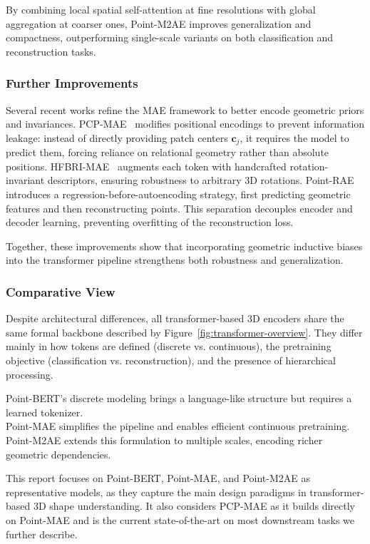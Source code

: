 By combining local spatial self-attention at fine resolutions with global aggregation at coarser ones, Point-M2AE improves generalization and compactness, outperforming single-scale variants on both classification and reconstruction tasks.

\subsubsection{Further Improvements}
\label{sssec:further_improvements}

Several recent works refine the MAE framework to better encode geometric priors and invariances.
PCP-MAE~\cite{pcpmae} modifies positional encodings to prevent information leakage: instead of directly providing patch centers $\mathbf{c}_j$, it requires the model to predict them, forcing reliance on relational geometry rather than absolute positions.
HFBRI-MAE~\cite{hfbrimae} augments each token with handcrafted rotation-invariant descriptors, ensuring robustness to arbitrary 3D rotations.
Point-RAE~\cite{prae} introduces a regression-before-autoencoding strategy, first predicting geometric features and then reconstructing points. This separation decouples encoder and decoder learning, preventing overfitting of the reconstruction loss.

Together, these improvements show that incorporating geometric inductive biases into the transformer pipeline strengthens both robustness and generalization.

\subsubsection{Comparative View}
\label{sssec:comparative_view}

Despite architectural differences, all transformer-based 3D encoders share the same formal backbone described by Figure~\ref{fig:transformer-overview}. They differ mainly in how tokens are defined (discrete vs. continuous), the pretraining objective (classification vs. reconstruction), and the presence of hierarchical processing.

Point-BERT’s discrete modeling brings a language-like structure but requires a learned tokenizer.\\
Point-MAE simplifies the pipeline and enables efficient continuous pretraining.\\
Point-M2AE extends this formulation to multiple scales, encoding richer geometric dependencies.

This report focuses on Point-BERT, Point-MAE, and Point-M2AE as representative models, as they capture the main design paradigms in transformer-based 3D shape understanding. It also considers PCP-MAE as it builds directly on Point-MAE and is the current state-of-the-art on most downstream tasks we further describe.


